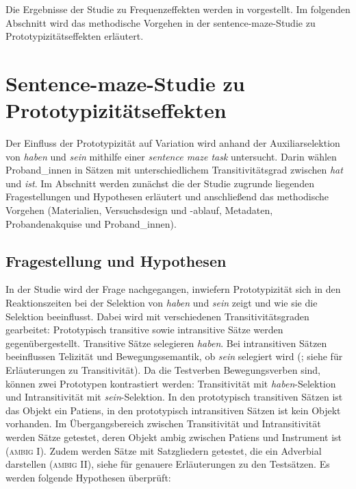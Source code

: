 Die Ergebnisse der Studie zu Frequenzeffekten werden in  vorgestellt. Im folgenden Abschnitt wird das methodische Vorgehen in der sentence-maze-Studie zu Prototypizitätseffekten erläutert.

\section{Sentence-maze-Studie zu Prototypizitätseffekten}
\label{metproto}

Der Einfluss der Prototypizität auf Variation wird anhand der Auxiliarselektion von \textit{haben} und \textit{sein} mithilfe einer \textit{sentence maze task} untersucht. Darin wählen Proband\_innen in Sätzen mit unterschiedlichem Transitivitätsgrad zwischen \textit{hat} und \textit{ist}. Im Abschnitt werden zunächst die der Studie zugrunde liegenden Fragestellungen und Hypothesen erläutert und anschließend das methodische Vorgehen  (Materialien, Versuchsdesign und -ablauf, Metadaten, Probandenakquise und Proband\_innen). 

\subsection{Fragestellung und Hypothesen}
\label{prothypo}

In der Studie wird der Frage nachgegangen, inwiefern Prototypizität sich in den Reak\-tionszeiten bei der Selektion von \textit{haben} und \textit{sein} zeigt und wie sie die Selektion beeinflusst. Dabei wird mit verschiedenen Transitivitätsgraden gearbeitet: Prototypisch transitive sowie intransitive Sätze werden gegenübergestellt. Transitive Sätze selegieren \textit{haben}. Bei intransitiven Sätzen beeinflussen Telizität und Bewegungssemantik, ob \textit{sein} selegiert wird (\cite[316--319]{Gillmann.2016}; siehe  für Erläuterungen zu Transitivität). Da die Testverben Bewegungsverben sind, können zwei Prototypen kontrastiert werden: Transitivität mit \textit{haben}-Selektion und Intransitivität mit \textit{sein}-Selektion. In den prototypisch transitiven Sätzen ist das Objekt ein Patiens, in den prototypisch intransitiven Sätzen ist kein Objekt vorhanden. Im Übergangsbereich zwischen Transitivität und Intransitivität werden Sätze getestet, deren Objekt ambig zwischen Patiens und Instrument ist (\textsc{ambig I}). Zudem werden Sätze mit Satzgliedern getestet, die ein Adverbial darstellen (\textsc{ambig II}), siehe  für genauere Erläuterungen zu den Testsätzen. Es werden folgende Hypothesen überprüft:

